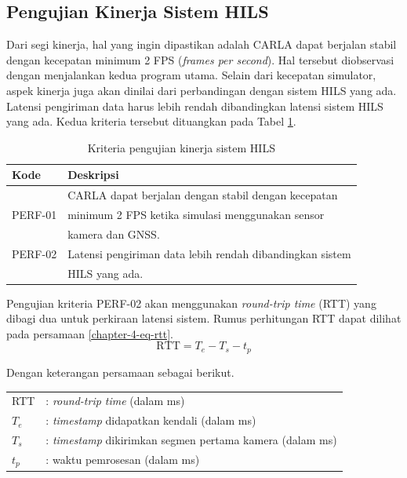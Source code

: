 \subsection{Pengujian Kinerja Sistem HILS}

Dari segi kinerja, hal yang ingin dipastikan adalah CARLA dapat berjalan stabil
dengan kecepatan minimum 2 FPS (\textit{frames per second}). Hal tersebut
diobservasi dengan menjalankan kedua program utama. Selain dari kecepatan
simulator, aspek kinerja juga akan dinilai dari perbandingan dengan sistem HILS
yang ada. Latensi pengiriman data harus lebih rendah dibandingkan latensi sistem
HILS yang ada. Kedua kriteria tersebut dituangkan pada Tabel
\ref{chapter-4-tbl-perf-criteria}.
\begin{table}[!htbp]
	\begin{center}
		\begin{tabular}{|l|l|}
			\hline
			\textbf{Kode} & \textbf{Deskripsi}                                       \\
			\hline
			              & CARLA dapat berjalan dengan stabil dengan kecepatan      \\
			PERF-01       & minimum 2 FPS ketika simulasi menggunakan sensor         \\
			              & kamera dan GNSS.                                         \\
			\hline
			PERF-02       & Latensi pengiriman data lebih rendah dibandingkan sistem \\
			              & HILS yang ada.                                           \\
			\hline
		\end{tabular}
	\end{center}
	\caption{Kriteria pengujian kinerja sistem HILS}
	\label{chapter-4-tbl-perf-criteria}
\end{table}

Pengujian kriteria PERF-02 akan menggunakan \textit{round-trip time} (RTT) yang
dibagi dua untuk perkiraan latensi sistem. Rumus perhitungan RTT dapat dilihat
pada persamaan \ref{chapter-4-eq-rtt}.
\begin{equation}
	\label{chapter-4-eq-rtt}
	\text{RTT} = T_{e} - T_{s} - t_p
\end{equation}

Dengan keterangan persamaan sebagai berikut.
\begin{table}[!h]
	\begin{tabular}{l l}
		RTT     & :     \textit{round-trip time} (dalam ms)             \\
		$T_{e}$ & : \textit{timestamp} didapatkan kendali (dalam ms)    \\
		$T_{s}$ & : \textit{timestamp} dikirimkan segmen pertama kamera
		(dalam ms)                                                      \\
		$t_p$   & :   waktu pemrosesan (dalam ms)
	\end{tabular}
\end{table}

